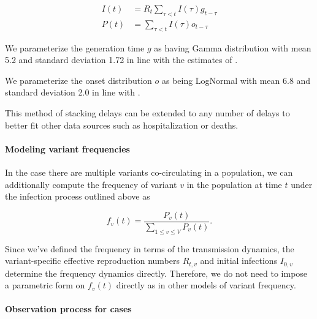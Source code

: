 \documentclass[12pt]{article}
\begin{document}
\begin{align}
  I(t) &= R_{t} \sum_{\tau < t} I(\tau) g_{t-\tau}\\
  P(t) &= \sum_{\tau < t} I(\tau) o_{t-\tau}
\end{align}

We parameterize the generation time $g$ as having Gamma distribution with mean 5.2 and standard deviation 1.72 in line with the estimates of \cite{Ganyani2020}.

We parameterize the onset distribution $o$ as being LogNormal with mean 6.8 and standard deviation 2.0 in line with \cite{Cheng2021}.


This method of stacking delays can be extended to any number of delays to better fit other data sources such as hospitalization or deaths.

\paragraph{Modeling variant frequencies}%

In the case there are multiple variants co-circulating in a population, we can additionally compute the frequency of variant $v$ in the population at time $t$ under the infection process outlined above as

\begin{equation}
  f_{v}(t) = \frac{P_{v}(t)}{ \sum_{1\leq v \leq V} P_{v}(t)}.
\end{equation}

Since we've defined the frequency in terms of the transmission dynamics, the variant-specific effective reproduction numbers $R_{t,v}$ and initial infections $I_{0, v}$ determine the frequency dynamics directly. 
Therefore, we do not need to impose a parametric form on $f_{v}(t)$ directly as in other models of variant frequency.

\paragraph{Observation process for cases}%
\end{document}
